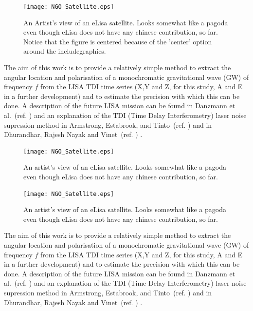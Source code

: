 \documentclass[11pt,twoside]{article}
\begin{document}
\begin{enumerate}
\begin{figure}[!h]
\begin{center}
\texttt{[image: NGO\_Satellite.eps]}
\caption{\label{fig3}An Artist's view of an eLisa satellite. Looks somewhat like a pagoda even though eLisa does not have any chinese contribution, so far. Notice that the figure is centered because of the 'center' option around the includegraphics.}
\end{center}
\end{figure}

The aim of this work is to provide a relatively simple method to extract the angular location and polarisation of a monochromatic gravitational wave (GW) of frequency $f$ from the LISA TDI  time series (X,Y and Z, for this study, A and E in a further development) and to estimate the precision with which this can be done. A description of the future LISA mission can be found in Danzmann et al.~(ref. \cite{Danzmann:2009uz}) and  an explanation of the TDI (Time Delay Interferometry) laser noise supression method  in Armstrong, Estabrook, and Tinto~(ref. \cite{Tinto:2002vr}) and in Dhurandhar, Rajesh Nayak and Vinet~(ref. \cite{Petiteau:2008vs}) .

\begin{figure}[!h]
\begin{minipage}{6.8cm}
\texttt{[image: NGO\_Satellite.eps]}
\caption{\label{fig4}An artist's view of an eLisa satellite. Looks somewhat like a pagoda even though eLisa does not have any chinese contribution, so far.}
\end{minipage}\hspace{0.2cm}
\begin{minipage}{6.8cm}
\texttt{[image: NGO\_Satellite.eps]}
\caption{\label{fig5}An artist's view of an eLisa satellite. Looks somewhat like a pagoda even though eLisa does not have any chinese contribution, so far.}
\end{minipage} 
\end{figure}

The aim of this work is to provide a relatively simple method to extract the angular location and polarisation of a monochromatic gravitational wave (GW) of frequency $f$ from the LISA TDI  time series (X,Y and Z, for this study, A and E in a further development) and to estimate the precision with which this can be done. A description of the future LISA mission can be found in Danzmann et al.~(ref. \cite{Danzmann:2009uz}) and  an explanation of the TDI (Time Delay Interferometry) laser noise supression method  in Armstrong, Estabrook, and Tinto~(ref. \cite{Tinto:2002vr}) and in Dhurandhar, Rajesh Nayak and Vinet~(ref. \cite{Petiteau:2008vs}) .


\end{enumerate}
\end{document}
